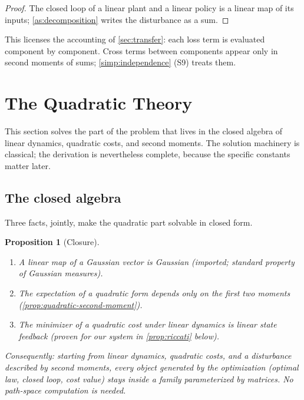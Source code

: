 \documentclass[11pt, a4paper]{article}
\theoremstyle{definition}
\theoremstyle{plain}
\newtheorem{proposition}[theorem]{Proposition}
\theoremstyle{remark}
\begin{document}
\begin{proof}
The closed loop of a linear plant and a linear policy is a linear map of
its inputs; \cref{as:decomposition} writes the disturbance as a sum.
\end{proof}

This licenses the accounting of \cref{sec:transfer}: each loss term is
evaluated component by component.  Cross terms between components appear
only in second moments of sums; \cref{simp:independence} (S9) treats
them.

\section{The Quadratic Theory}\label{sec:quadratic}

This section solves the part of the problem that lives in the closed
algebra of linear dynamics, quadratic costs, and second moments.  The
solution machinery is classical; the derivation is nevertheless complete,
because the specific constants matter later.

\subsection{The closed algebra}\label{sec:closure}

Three facts, jointly, make the quadratic part solvable in closed form.

\begin{proposition}[Closure]\label{prop:closure}
\begin{enumerate}[label=(\roman*)]
  \item A linear map of a Gaussian vector is Gaussian (imported; standard
    property of Gaussian measures).
  \item The expectation of a quadratic form depends only on the first two
    moments (\cref{prop:quadratic-second-moment}).
  \item The minimizer of a quadratic cost under linear dynamics is linear
    state feedback (proven for our system in \cref{prop:riccati} below).
\end{enumerate}
Consequently: starting from linear dynamics, quadratic costs, and a
disturbance described by second moments, every object generated by the
optimization (optimal law, closed loop, cost value) stays inside a family
parameterized by matrices.  No path-space computation is needed.
\end{proposition}
\end{document}
